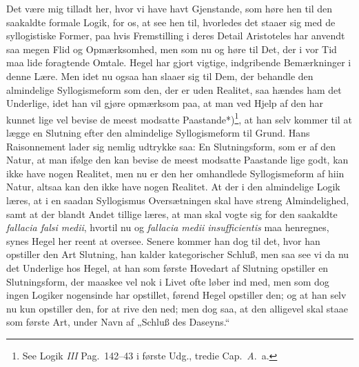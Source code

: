 \documentclass[12pt,a4paper]{book}
\newcommand{\apage}[1]{\marginnote{\footnotesize\textit{[#1]}}}
\begin{document}
%
Det være mig tilladt her, hvor vi have havt Gjenstande, som høre hen til
den saakaldte formale Logik, for os, at see hen til, hvorledes det staaer
sig med de syllogistiske Former, paa hvis Fremstilling i deres Detail
Aristoteles har anvendt saa megen Flid og Opmærksomhed, men som nu og høre
til Det, der i vor Tid maa lide foragtende Omtale. Hegel har gjort vigtige,
indgribende Bemærkninger i denne Lære. Men idet nu ogsaa han slaaer sig til
Dem, der behandle den almindelige Syllogismeform som den, der er uden
Realitet, saa hændes ham det Underlige, idet han vil gjøre opmærksom paa,
at man ved Hjelp af den har kunnet lige vel bevise de meest modsatte
Paastande*)\footnote{See Logik \textit{III} Pag.\ 142--43 i første Udg., tredie
Cap.\ \textit{A}.\ a.}, at han selv kommer til at lægge en Slutning efter den
almindelige Syllogismeform til Grund. Hans Raisonnement lader sig nemlig
udtrykke saa: En Slutningsform, som er af den Natur, at man ifølge den kan
bevise de meest modsatte Paastande lige godt, kan ikke have nogen Realitet,
men nu er den her omhandlede Syllogismeform af hiin Natur, altsaa kan den
ikke have nogen Realitet. At der i den almindelige Logik læres, at i en
saadan Syllogismus Oversætningen skal have streng Almindelighed, samt at
der blandt Andet tillige læres, at man skal vogte sig for den saakaldte
\textit{fallacia falsi medii}, hvortil nu og \textit{fallacia medii
insufficientis} maa \apage{89} henregnes, synes Hegel her reent at oversee. Senere
kommer han dog til det, hvor han opstiller den Art Slutning, han kalder
kategorischer Schluß, men saa see vi da nu det Underlige hos Hegel, at han
som første Hovedart af Slutning opstiller en Slutningsform, der maaskee vel
nok i Livet ofte løber ind med, men som dog ingen Logiker nogensinde har
opstillet, førend Hegel opstiller den; og at han selv nu kun opstiller den,
for at rive den ned; men dog saa, at den alligevel skal staae som første
Art, under Navn af „Schluß des Daseyns.“
\end{document}
